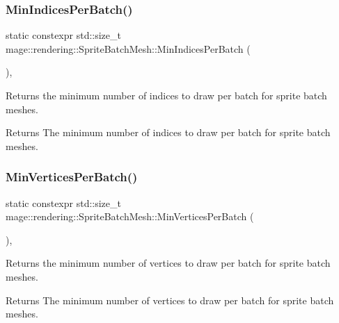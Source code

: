 \subsubsection{\texorpdfstring{Min\+Indices\+Per\+Batch()}{MinIndicesPerBatch()}}
{\footnotesize\ttfamily static constexpr std\+::size\+\_\+t mage\+::rendering\+::\+Sprite\+Batch\+Mesh\+::\+Min\+Indices\+Per\+Batch (\begin{DoxyParamCaption}{ }\end{DoxyParamCaption})\hspace{0.3cm}{\ttfamily [static]}, {\ttfamily [noexcept]}}

Returns the minimum number of indices to draw per batch for sprite batch meshes.

\begin{DoxyReturn}{Returns}
The minimum number of indices to draw per batch for sprite batch meshes. 
\end{DoxyReturn}
\mbox{\label{classmage_1_1rendering_1_1_sprite_batch_mesh_a256f9f0dd41a71cbc2572cfc65d6f711}} 
\subsubsection{\texorpdfstring{Min\+Vertices\+Per\+Batch()}{MinVerticesPerBatch()}}
{\footnotesize\ttfamily static constexpr std\+::size\+\_\+t mage\+::rendering\+::\+Sprite\+Batch\+Mesh\+::\+Min\+Vertices\+Per\+Batch (\begin{DoxyParamCaption}{ }\end{DoxyParamCaption})\hspace{0.3cm}{\ttfamily [static]}, {\ttfamily [noexcept]}}

Returns the minimum number of vertices to draw per batch for sprite batch meshes.

\begin{DoxyReturn}{Returns}
The minimum number of vertices to draw per batch for sprite batch meshes. 
\end{DoxyReturn}
\mbox{\label{classmage_1_1rendering_1_1_sprite_batch_mesh_a7855038d3367c62dcbb2d3227cdb5c81}} 
